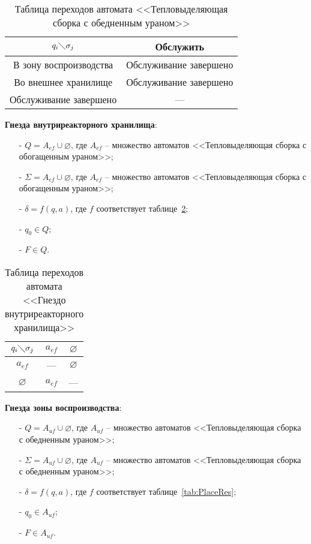 \begin{table} [htbp]
  \centering
  \parbox{15cm}{\caption{Таблица переходов автомата <<Тепловыделяющая сборка с обедненным ураном>>}\label{tab:DFuel}}
  \begin{center}
  \begin{tabular}{| c | c |}
  \hline
  $q_i \diagdown \sigma_j$& Обслужить \\
  \hline
  В зону воспроизводства & Обслуживание завершено\\
  \hline
  Во внешнее хранилище& Обслуживание завершено\\
  \hline
  Обслуживание завершено & ---\\
  \hline
  \end{tabular}
  \end{center}
\end{table}

\textbf{Гнезда внутриреакторного хранилища}:
\begin{itemize}
 \item [-] $Q =  A_{ef} \cup \varnothing$, где $A_{ef}$ -- множество автоматов <<Тепловыделяющая сборка с обогащенным ураном>>;
 \item [-] $\Sigma =  A_{ef} \cup \varnothing$, где $A_{ef}$ -- множество автоматов <<Тепловыделяющая сборка с обогащенным ураном>>;
 \item [-] $\delta = f (q, a)$, где $f$ соответствует таблице~\ref{tab:PlaceIn};
 \item [-] $q_0 \in Q$;
 \item [-] $F \in Q$.
\end{itemize}

\begin{table} [htbp]
  \centering
  \parbox{15cm}{\caption{Таблица переходов автомата <<Гнездо внутриреакторного хранилища>>}\label{tab:PlaceIn}}
  \begin{center}
  \begin{tabular}{| c | c | c |}
  \hline
  $q_i \diagdown \sigma_j$& $a_{ef}$ & $\varnothing$ \\
  \hline
  $a_{ef}$&  --- & $\varnothing$\\
  \hline
  $\varnothing$ & $a_{ef}$ & ---\\
  \hline
  \end{tabular}
  \end{center}
\end{table}

\textbf{Гнезда зоны воспроизводства}:
\begin{itemize}
 \item [-] $Q =  A_{uf} \cup \varnothing$, где $A_{uf}$ -- множество автоматов <<Тепловыделяющая сборка с обедненным ураном>>;
 \item [-] $\Sigma =  A_{uf} \cup \varnothing$, где $A_{uf}$ -- множество автоматов <<Тепловыделяющая сборка с обедненным ураном>>;
 \item [-] $\delta = f (q, a)$, где $f$ соответствует таблице~\ref{tab:PlaceRes};
 \item [-] $q_0 \in A_{uf} $;
 \item [-] $F \in A_{uf} $.
\end{itemize}

